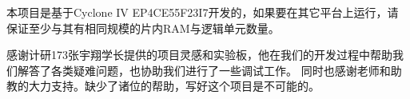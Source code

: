 
 本项目是基于Cyclone IV EP4CE55F23I7开发的，如果要在其它平台上运行，请保证至少与其有相同规模的片内RAM与逻辑单元数量。

 感谢计研173张宇翔学长提供的项目灵感和实验板，他在我们的开发过程中帮助我们解答了各类疑难问题，也协助我们进行了一些调试工作。
 同时也感谢老师和助教的大力支持。缺少了诸位的帮助，写好这个项目是不可能的。